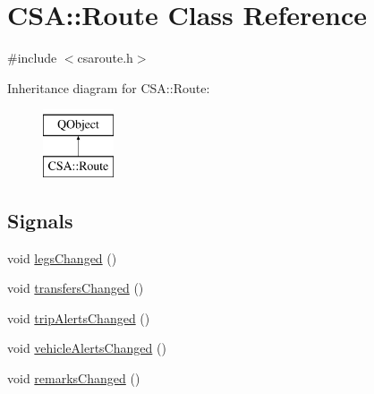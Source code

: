 \hypertarget{classCSA_1_1Route}{}\section{C\+SA\+:\+:Route Class Reference}
\label{classCSA_1_1Route}


{\ttfamily \#include $<$csaroute.\+h$>$}

Inheritance diagram for C\+SA\+:\+:Route\+:\begin{figure}[H]
\begin{center}
\leavevmode
\includegraphics[height=2.000000cm]{classCSA_1_1Route}
\end{center}
\end{figure}
\subsection*{Signals}
\begin{DoxyCompactItemize}
\item 
void \mbox{\hyperlink{classCSA_1_1Route_a6ab64667f4573fd2c9cd8c0b6ab88b46}{legs\+Changed}} ()
\item 
void \mbox{\hyperlink{classCSA_1_1Route_adce4cb4749b3f2668efe082f011a2e47}{transfers\+Changed}} ()
\item 
void \mbox{\hyperlink{classCSA_1_1Route_afe760a3c1e840dfde35219466fa8c5c3}{trip\+Alerts\+Changed}} ()
\item 
void \mbox{\hyperlink{classCSA_1_1Route_a44e976e85e907dfc3b0704c8ce4db5bf}{vehicle\+Alerts\+Changed}} ()
\item 
void \mbox{\hyperlink{classCSA_1_1Route_ab31ce6bceb5dca29f7f74719e50e07df}{remarks\+Changed}} ()
\end{DoxyCompactItemize}
